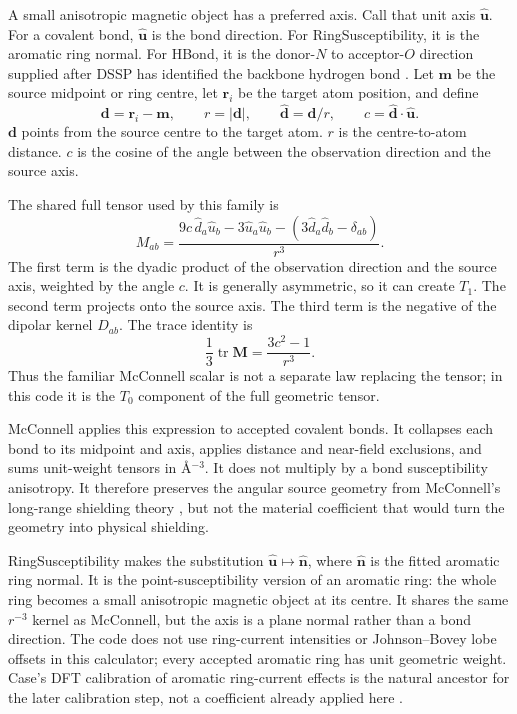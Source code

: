 \documentclass[11pt]{article}
\begin{document}
A small anisotropic magnetic object has a preferred axis. Call that unit axis
\(\hat{\bm u}\). For a covalent bond, \(\hat{\bm u}\) is the bond direction.
For RingSusceptibility, it is the aromatic ring normal. For HBond, it is the
donor-\(N\) to acceptor-\(O\) direction supplied after DSSP has identified the
backbone hydrogen bond \cite{kabsch1983}. Let \(\bm m\) be the source midpoint
or ring centre, let \(\bm r_i\) be the target atom position, and define
\[
  \bm d=\bm r_i-\bm m,\qquad
  r=|\bm d|,\qquad
  \hat{\bm d}=\bm d/r,\qquad
  c=\hat{\bm d}\cdot\hat{\bm u}.
\]
\(\bm d\) points from the source centre to the target atom. \(r\) is the
centre-to-atom distance. \(c\) is the cosine of the angle between the
observation direction and the source axis.

The shared full tensor used by this family is
\[
  M_{ab}
  =
  \frac{
    9c\,\hat d_a\hat u_b
    -3\hat u_a\hat u_b
    -\left(3\hat d_a\hat d_b-\delta_{ab}\right)}
  {r^3}.
\]
The first term is the dyadic product of the observation direction and the
source axis, weighted by the angle \(c\). It is generally asymmetric, so it can
create \(T_1\). The second term projects onto the source axis. The third term
is the negative of the dipolar kernel \(D_{ab}\). The trace identity is
\[
  \frac{1}{3}\operatorname{tr}\bm M
  =
  \frac{3c^2-1}{r^3}.
\]
Thus the familiar McConnell scalar is not a separate law replacing the tensor;
in this code it is the \(T_0\) component of the full geometric tensor.

McConnell applies this expression to accepted covalent bonds. It collapses each
bond to its midpoint and axis, applies distance and near-field exclusions, and
sums unit-weight tensors in \(\si{\angstrom^{-3}}\). It does not multiply by a
bond susceptibility anisotropy. It therefore preserves the angular source
geometry from McConnell's long-range shielding theory \cite{mcconnell1957}, but
not the material coefficient that would turn the geometry into physical
shielding.

RingSusceptibility makes the substitution
\(\hat{\bm u}\mapsto\hat{\bm n}\), where \(\hat{\bm n}\) is the fitted aromatic
ring normal. It is the point-susceptibility version of an aromatic ring: the
whole ring becomes a small anisotropic magnetic object at its centre. It shares
the same \(r^{-3}\) kernel as McConnell, but the axis is a plane normal rather
than a bond direction. The code does not use ring-current intensities or
Johnson--Bovey lobe offsets in this calculator; every accepted aromatic ring
has unit geometric weight. Case's DFT calibration of aromatic ring-current
effects is the natural ancestor for the later calibration step, not a coefficient
already applied here \cite{case1995}.
\end{document}
